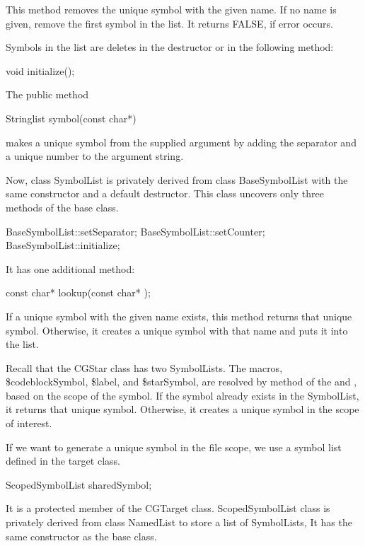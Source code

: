 This method removes the unique symbol with the given name. If no name is given,
remove the first symbol in the list. It returns FALSE, if error occurs.

Symbols in the list are deletes in the destructor or in the following method:

\begin{example}
void initialize();
\end{example}

The public method

\begin{example}
Stringlist symbol(const char*)
\end{example}

makes a unique symbol from the supplied argument by adding the separator and
a unique number to the argument string.

Now, class SymbolList is privately derived from class BaseSymbolList with
the same constructor and a default destructor.
This class uncovers only three methods of the base class.

\begin{example}
BaseSymbolList::setSeparator;
BaseSymbolList::setCounter;
BaseSymbolList::initialize;
\end{example}

It has one additional method:

\begin{example}
const char* lookup(const char* );
\end{example}

If a unique symbol with the given name exists, this method returns that
unique symbol. Otherwise, it creates a unique symbol with that name and 
puts it into the list.

Recall that the CGStar class has two SymbolLists. The macros,
\$codeblockSymbol, \$label, and \$starSymbol, are resolved by 
method of the  and , based on
the scope of the symbol. If the symbol already exists in the SymbolList,
it returns that unique symbol. Otherwise, it creates a unique symbol
in the scope of interest.

If we want to generate a unique symbol in the file scope, we use a symbol
list defined in the target class.

\begin{example}
ScopedSymbolList sharedSymbol;
\end{example}

It is a protected member of the CGTarget class. ScopedSymbolList class is
privately derived from class NamedList to store a list of SymbolLists, 
It has the same constructor as the base class. 

